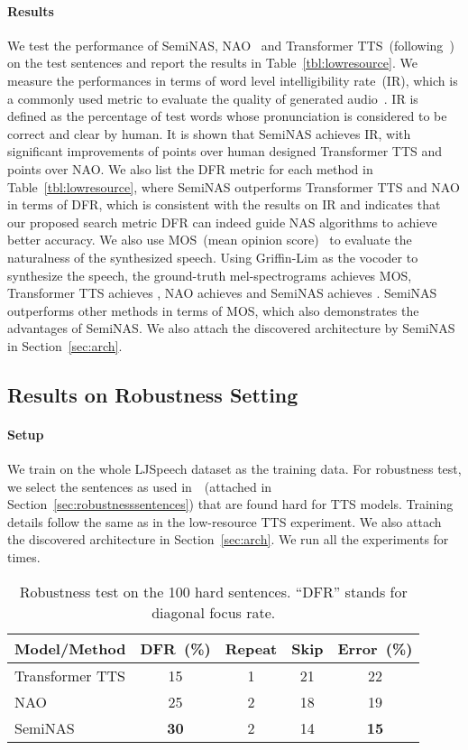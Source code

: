 \documentclass{article}
\begin{document}
\paragraph{Results} We test the performance of SemiNAS, NAO~\cite{nao} and Transformer TTS~(following~\cite{transformertts}) on the  test sentences and report the results in Table~\ref{tbl:lowresource}. We measure the performances in terms of word level intelligibility rate~(IR), which is a commonly used metric to evaluate the quality of generated audio~\cite{unsuperttsasr}. IR is defined as the percentage of test words whose pronunciation is considered to be correct and clear by human. It is shown that SemiNAS achieves  IR, with significant improvements of  points over human designed Transformer TTS and  points over NAO. We also list the DFR metric for each method in Table~\ref{tbl:lowresource}, where SemiNAS outperforms Transformer TTS and NAO in terms of DFR, which is consistent with the results on IR and indicates that our proposed search metric DFR can indeed guide NAS algorithms to achieve better accuracy. We also use MOS~(mean opinion score)~\cite{mos} to evaluate the naturalness of the synthesized speech. Using Griffin-Lim as the vocoder to synthesize the speech, the ground-truth mel-spectrograms achieves  MOS, Transformer TTS achieves , NAO achieves  and SemiNAS achieves . SemiNAS outperforms other methods in terms of MOS, which also demonstrates the advantages of SemiNAS. We also attach the discovered architecture by SemiNAS in Section~\ref{sec:arch}.

\subsection{Results on Robustness Setting}
\paragraph{Setup} We train on the whole LJSpeech dataset as the training data. For robustness test, we select the  sentences as used in~\cite{deepvoice3}~(attached in Section~\ref{sec:robustnesssentences}) that are found hard for TTS models. Training details follow the same as in the low-resource TTS experiment. We also attach the discovered architecture in Section~\ref{sec:arch}. We run all the experiments for  times.
\begin{table}[htbp]
\centering
\small
\begin{tabular}{lcccc}
\toprule
Model/Method    & DFR~(\%) & Repeat & Skip & Error~(\%)\\
\midrule
Transformer TTS\cite{transformertts} & 15 & 1 & 21 & 22\\ 
NAO~\cite{nao}  & 25 & 2 & 18 & 19 \\
SemiNAS         & \textbf{30} & 2 & 14 & \textbf{15}\\
\bottomrule
\end{tabular}
\caption{Robustness test on the 100 hard sentences. ``DFR'' stands for diagonal focus rate.}
\label{tbl:robust}
\end{table}
\end{document}
